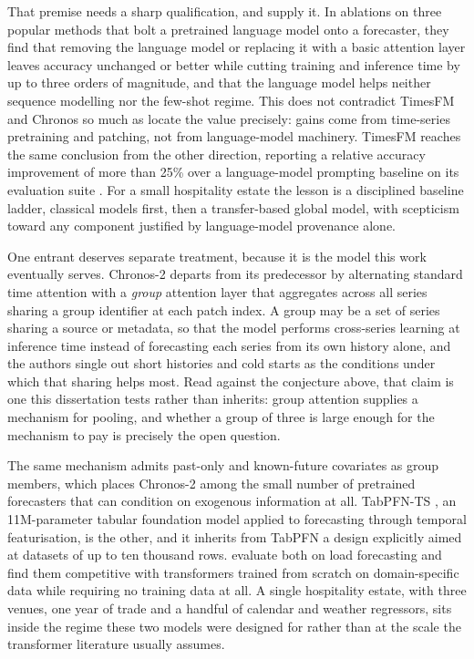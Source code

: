 That premise needs a sharp qualification, and \citet{tan_are_2024} supply it.
In ablations on three popular methods that bolt a pretrained language model
onto a forecaster, they find that removing the language model or replacing it
with a basic attention layer leaves accuracy unchanged or better while cutting
training and inference time by up to three orders of magnitude, and that the
language model helps neither sequence modelling nor the few-shot regime. This
does not contradict TimesFM and Chronos so much as locate the value precisely:
gains come from time-series pretraining and patching, not from language-model
machinery. TimesFM reaches the same conclusion from the other direction,
reporting a relative accuracy improvement of more than 25\% over a
language-model prompting baseline on its evaluation suite
\citep{das_decoder-only_2024}. For a small hospitality estate the lesson is a
disciplined baseline ladder, classical models first, then a transfer-based
global model, with scepticism toward any component justified by language-model
provenance alone.

One entrant deserves separate treatment, because it is the model this work
eventually serves. Chronos-2 \citep[a 2025 preprint]{ansari_chronos-2_2025}
departs from its predecessor by alternating standard time attention with a
\emph{group} attention layer that aggregates across all series sharing a group
identifier at each patch index. A group may be a set of series sharing a source
or metadata, so that the model performs cross-series learning at inference time
instead of forecasting each series from its own history alone, and the authors
single out short histories and cold starts as the conditions under which that
sharing helps most. Read against the conjecture above, that claim is one this
dissertation tests rather than inherits: group attention supplies a mechanism
for pooling, and whether a group of three is large enough for the mechanism to
pay is precisely the open question.

The same mechanism admits past-only and known-future covariates as group
members, which places Chronos-2 among the small number of pretrained
forecasters that can condition on exogenous information at all. TabPFN-TS
\citep[a 2026 preprint]{hoo_tables_2026}, an 11M-parameter tabular foundation
model applied to forecasting through temporal featurisation, is the other, and
it inherits from TabPFN \citep{hollmann_accurate_2025} a design explicitly
aimed at datasets of up to ten thousand rows. \citet{hertel_explainable_2026}
evaluate both on load forecasting and find them competitive with transformers
trained from scratch on domain-specific data while requiring no training data
at all. A single hospitality estate, with three venues, one year of trade and a
handful of calendar and weather regressors, sits inside the regime these two
models were designed for rather than at the scale the transformer literature
usually assumes.

